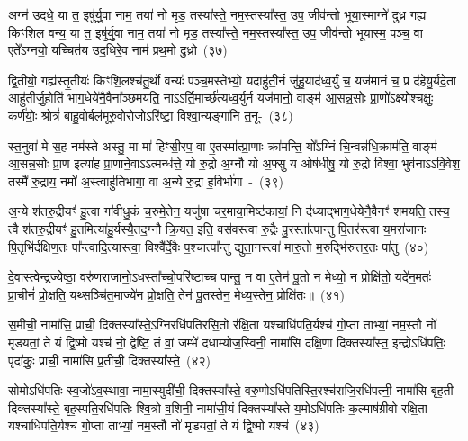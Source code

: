 अग्न॑ उदधे॒ या त॒ इषु॑र्यु॒वा नाम॒ तया॑ नो मृड॒ तस्या᳚स्ते॒ नम॒स्तस्या᳚स्त॒ उप॒ जीव॑न्तो भूया॒स्माग्ने॑ दुध्र गह्य किꣳशिल वन्य॒ या त॒ इषु॑र्यु॒वा नाम॒ तया॑ नो मृड॒ तस्या᳚स्ते॒ नम॒स्तस्या᳚स्त॒ उप॒ जीव॑न्तो भूयास्म॒ पञ्च॒ वा ए॒ते᳚\-ऽग्नयो॒ यच्चित॑य उद॒धिरे॒व नाम॑ प्रथ॒मो दु॒ध्रो~(३७)\ip

द्वि॒तीयो॒ गह्य॑स्तृ॒तीयः॑ किꣳशि॒लश्च॑तु॒र्थो वन्यः॑ पञ्च॒मस्तेभ्यो॒ यदाहु॑ती॒र्न जु॑हु॒याद॑ध्व॒र्युं च॒ यज॑मानं च॒ प्र द॑हेयु॒र्यदे॒ता आहु॑तीर्जु॒होति॑ भाग॒\-धेये॑नै॒वैना᳚ञ्छमयति॒ नाऽऽर्ति॒मार्च्छ॑त्यध्व॒र्युर्न यज॑मानो॒ वाङ्म॑ आ॒सन्न॒सोः प्रा॒णो᳚\-ऽक्ष्योश्चक्षुः॒ कर्ण॑योः॒ श्रोत्रं॑ बाहु॒वोर्बल॑मूरु॒वोरोजो\-ऽरि॑ष्टा॒ विश्वा॒न्यङ्गा॑नि त॒नू-~(३८)\ip

स्त॒नुवा॑ मे स॒ह नम॑स्ते अस्तु॒ मा मा॑ हिꣳसी॒रप॒ वा ए॒तस्मा᳚त्प्रा॒णाः क्रा॑मन्ति॒ यो᳚\-ऽग्निं चि॒न्वन्न॑धि॒क्राम॑ति॒ वाङ्म॑ आ॒सन्न॒सोः प्रा॒ण इत्या॑ह प्रा॒णाने॒वा\-ऽऽ\-त्मन्ध॑त्ते॒ यो रु॒द्रो अ॒ग्नौ यो अ॒फ्सु य ओष॑धीषु॒ यो रु॒द्रो विश्वा॒ भुव॑ना\-ऽऽवि॒वेश॒ तस्मै॑ रु॒द्राय॒ नमो॑ अ॒स्त्वाहु॑तिभागा॒ वा अ॒न्ये रु॒द्रा ह॒विर्भा॑गा~-~(३९)\ip

अ॒न्ये श॑तरु॒द्रीयꣳ॑ हु॒त्वा गा॑वीधु॒कं च॒रुमे॒तेन॒ यजु॑षा चर॒माया॒मिष्ट॑कायां॒ नि द॑ध्याद्भाग॒\-धेये॑नै॒वैनꣳ॑ शमयति॒ तस्य॒ त्वै श॑तरु॒द्रीयꣳ॑ हु॒तमित्या॑हु॒र्यस्यै॒तद॒ग्नौ क्रि॒यत॒ इति॒ वस॑वस्त्वा रु॒द्रैः पु॒रस्ता᳚त्पान्तु पि॒तर॑स्त्वा य॒मरा॑जानः पि॒तृभि॑र्दक्षिण॒तः पा᳚न्त्वादि॒त्यास्त्वा॒ विश्वै᳚र्दे॒वैः प॒श्चात्पा᳚न्तु द्युता॒नस्त्वा॑ मारु॒तो म॒रुद्भि॑रुत्तर॒तः पा॑तु~(४०)\ip

दे॒वास्त्वेन्द्र॑ज्येष्ठा॒ वरु॑णराजानो॒\-ऽधस्ता᳚च्चो॒परि॑ष्टाच्च पान्तु॒ न वा ए॒तेन॑ पू॒तो न मेध्यो॒ न प्रोक्षि॑तो॒ यदे॑न॒मतः॑ प्रा॒चीनं॑ प्रो॒क्षति॒ यथ्सञ्चि॑त॒माज्ये॑न प्रो॒क्षति॒ तेन॑ पू॒तस्तेन॒ मेध्य॒स्तेन॒ प्रोक्षि॑तः॥~(४१)\ip

{\anuvakamend[{दु॒ध्रस्त॒नूर्\mbox{}ह॒विर्भा॑गाः पातु॒ द्वात्रिꣳ॑शच्च}]}

स॒मीची॒ नामा॑सि॒ प्राची॒ दिक्तस्या᳚स्ते॒\-ऽग्नि\-रधि॑\-पतिरसि॒तो र॑क्षि॒ता यश्चाधि॑\-पति॒र्यश्च॑ गो॒प्ता ताभ्यां॒ नम॒स्तौ नो॑ मृडयतां॒ ते यं द्वि॒ष्मो यश्च॑ नो॒ द्वेष्टि॒ तं वां॒ जम्भे॑ दधाम्योज॒स्विनी॒ नामा॑सि दक्षि॒णा दिक्तस्या᳚स्त॒ इन्द्रो\-ऽधि॑\-पतिः॒ पृदा॑कुः॒ प्राची॒ नामा॑सि प्र॒तीची॒ दिक्तस्या᳚स्ते॒~(४२)\ip

सोमो\-ऽधि॑\-पतिः स्व॒जो॑\-ऽव॒स्थावा॒ नामा॒स्युदी॑ची॒ दिक्तस्या᳚स्ते॒ वरु॒णो\-ऽधि॑\-पतिस्ति॒रश्च॑राजि॒रधि॑पत्नी॒ नामा॑सि बृह॒ती दिक्तस्या᳚स्ते॒ बृह॒स्पति॒रधि॑\-पतिः श्वि॒त्रो व॒शिनी॒ नामा॑सी॒यं दिक्तस्या᳚स्ते य॒मो\-ऽधि॑\-पतिः क॒ल्माष॑ग्रीवो रक्षि॒ता यश्चाधि॑\-पति॒र्यश्च॑ गो॒प्ता ताभ्यां॒ नम॒स्तौ नो॑ मृडयतां॒ ते यं द्वि॒ष्मो यश्च॑~(४३)\ip


